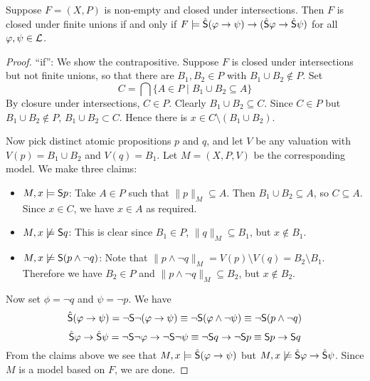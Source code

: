 \begin{proposition}
\label{exp_prop_finite_unions_frame_condition}

    Suppose $F = (X, P)$ is non-empty and closed under intersections. Then $F$
    is closed under finite unions if and only if $F \models \hat{\S}(\phi
    \limplies \psi) \limplies (\hat{\S}\phi \limplies \hat{\S}\psi)$ for all
    $\phi, \psi \in \cL$.

\begin{proof}

    ``if'': We show the contrapositive. Suppose $F$ is closed under
    intersections but not finite unions, so that there are $B_1, B_2
    \in P$ with $B_1 \cup B_2 \notin P$. Set
    \[
    C = \bigcap\{A \in P \mid B_1 \cup B_2 \subseteq A\}\]
    By closure under intersections, $C \in P$. Clearly $B_1 \cup
    B_2 \subseteq C$. Since $C \in P$ but $B_1 \cup B_2 \notin
    P$, $B_1 \cup B_2 \subset C$. Hence there is $x \in C
    \setminus (B_1 \cup B_2)$.

    Now pick distinct atomic propositions $p$ and $q$, and let $V$ be any
    valuation with $V(p) = B_1 \cup B_2$ and $V(q) = B_1$. Let $M = (X, P, V)$
    be the corresponding model. We make three claims:

    \begin{itemize}

        \item $M, x \models \S p$: Take $A \in P$ such that $\|p\|_M \subseteq
              A$. Then $B_1 \cup B_2 \subseteq A$, so $C \subseteq A$. Since $x
              \in C$, we have $x \in A$ as required.

        \item $M, x \not\models \S q$: This is clear since $B_1 \in P$,
              $\|q\|_M \subseteq B_1$, but $x \notin B_1$.

        \item $M, x \not\models \S (p \land \neg q)$: Note that $\|p \land \neg
              q\|_M = V(p) \setminus V(q) = B_2 \setminus B_1$. Therefore we
              have $B_2 \in P$ and $\|p \land \neg q\|_M \subseteq B_2$, but $x
              \notin B_2$.

    \end{itemize}

    Now set $\phi = \neg q$ and $\psi = \neg p$. We have
    \[
       \hat{\S}(\phi \limplies \psi)
       = \neg\S\neg(\phi \limplies \psi)
       \equiv \neg\S(\phi \land \neg\psi)
       \equiv \neg\S(p \land \neg q)
    \]
    \[
       \hat{\S}\phi \limplies \hat{\S}\psi
       = \neg\S\neg\phi \limplies \neg\S\neg\psi
       \equiv \neg\S q \limplies \neg\S p
       \equiv \S p \limplies \S q
    \]
    From the claims above we see that $M, x \models \hat{\S}(\phi
    \limplies \psi)$ but $M, x \not\models \hat{\S}\phi \limplies
    \hat{\S}\psi$. Since $M$ is a model based on $F$, we are
    done.


\end{proof}
\end{proposition}
